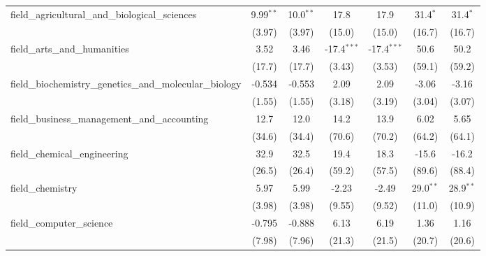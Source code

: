 \begin{tabular}{lcccccc}
   field\_agricultural\_and\_biological\_sciences              & 9.99$^{**}$   & 10.0$^{**}$   & 17.8          & 17.9          & 31.4$^{*}$     & 31.4$^{*}$\\   
                                                               & (3.97)        & (3.97)        & (15.0)        & (15.0)        & (16.7)         & (16.7)\\   
   field\_arts\_and\_humanities                                & 3.52          & 3.46          & -17.4$^{***}$ & -17.4$^{***}$ & 50.6           & 50.2\\   
                                                               & (17.7)        & (17.7)        & (3.43)        & (3.53)        & (59.1)         & (59.2)\\   
   field\_biochemistry\_genetics\_and\_molecular\_biology      & -0.534        & -0.553        & 2.09          & 2.09          & -3.06          & -3.16\\   
                                                               & (1.55)        & (1.55)        & (3.18)        & (3.19)        & (3.04)         & (3.07)\\   
   field\_business\_management\_and\_accounting                & 12.7          & 12.0          & 14.2          & 13.9          & 6.02           & 5.65\\   
                                                               & (34.6)        & (34.4)        & (70.6)        & (70.2)        & (64.2)         & (64.1)\\   
   field\_chemical\_engineering                                & 32.9          & 32.5          & 19.4          & 18.3          & -15.6          & -16.2\\   
                                                               & (26.5)        & (26.4)        & (59.2)        & (57.5)        & (89.6)         & (88.4)\\   
   field\_chemistry                                            & 5.97          & 5.99          & -2.23         & -2.49         & 29.0$^{**}$    & 28.9$^{**}$\\   
                                                               & (3.98)        & (3.98)        & (9.55)        & (9.52)        & (11.0)         & (10.9)\\   
   field\_computer\_science                                    & -0.795        & -0.888        & 6.13          & 6.19          & 1.36           & 1.16\\   
                                                               & (7.98)        & (7.96)        & (21.3)        & (21.5)        & (20.7)         & (20.6)\\   

\end{tabular}
